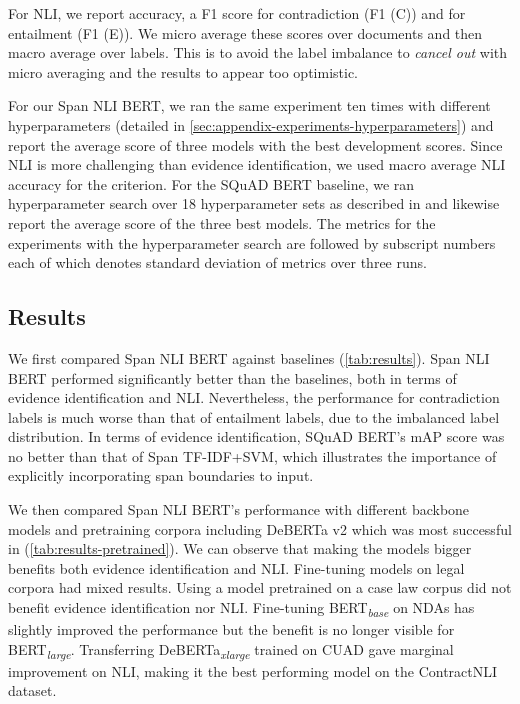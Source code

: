 


For NLI, we report accuracy, a F1 score for contradiction (F1 (C)) and for entailment (F1 (E)).
We micro average these scores over documents and then macro average over labels.
This is to avoid the label imbalance to \emph{cancel out} with micro averaging and the results to appear too optimistic.

For our Span NLI BERT, we ran the same experiment ten times with different hyperparameters (detailed in \cref{sec:appendix-experiments-hyperparameters}) and report the average score of three models with the best development scores.
Since NLI is more challenging than evidence identification, we used macro average NLI accuracy for the criterion.
For the SQuAD BERT baseline, we ran hyperparameter search over 18 hyperparameter sets as described in \cite{devlin_bert_2019} and likewise report the average score of the three best models.
The metrics for the experiments with the hyperparameter search are followed by subscript numbers each of which denotes standard deviation of metrics over three runs.

\subsection{Results}

We first compared Span NLI BERT against baselines (\cref{tab:results}).
Span NLI BERT performed significantly better than the baselines, both in terms of evidence identification and NLI.
Nevertheless, the performance for contradiction labels is much worse than that of entailment labels, due to the imbalanced label distribution.
In terms of evidence identification, SQuAD BERT's mAP score was no better than that of Span TF-IDF+SVM, which illustrates the importance of explicitly incorporating span boundaries to input.

We then compared Span NLI BERT's performance with different backbone models and pretraining corpora including DeBERTa v2 \cite{he_deberta_2021} which was most successful in \cite{hendrycks_cuad_2021} (\cref{tab:results-pretrained}).
We can observe that making the models bigger benefits both evidence identification and NLI.
Fine-tuning models on legal corpora had mixed results.
Using a model pretrained on a case law corpus \cite{zheng_when_2021} did not benefit evidence identification nor NLI.
Fine-tuning BERT\textsubscript{\textit{base}} on NDAs has slightly improved the performance but the benefit is no longer visible for BERT\textsubscript{\textit{large}}.
Transferring DeBERTa\textsubscript{\textit{xlarge}} trained on CUAD \cite{hendrycks_cuad_2021} gave marginal improvement on NLI, making it the best performing model on the ContractNLI dataset.


